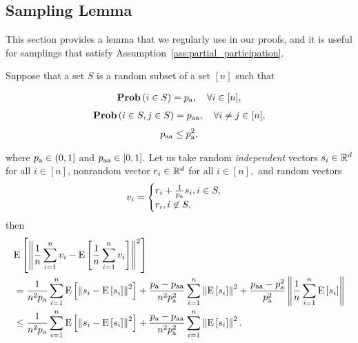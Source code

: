 \documentclass{article}
\newcommand*{\probavailable}{\ensuremath{p_{\textnormal{a}}}}
\newcommand*{\probpairaa}{\ensuremath{p_{\textnormal{aa}}}}
\begin{document}
\subsection{Sampling Lemma}
This section provides a lemma that we regularly use in our proofs, and it is useful for samplings that satisfy Assumption~\ref{ass:partial_participation}.
\begin{lemma}
  \label{lemma:sampling}
  Suppose that a set $S$ is a random subset of a set $[n]$ such that
  \begin{enumerate}
    \Item \begin{align*}\Prob\left(i \in S\right) = \probavailable, \quad \forall i \in [n],\end{align*}
    \Item \begin{align*}\Prob\left(i \in S, j \in S\right) = \probpairaa, \quad \forall i \neq j \in [n],\end{align*}
    \Item \begin{align*}
      \probpairaa \leq \probavailable^2,
    \end{align*}
  \end{enumerate}
  where $\probavailable \in (0, 1]$ and $\probpairaa \in [0, 1].$ Let us take random \textit{independent} vectors $s_i \in \mathbb{R}^d$ for all $i \in [n]$, nonrandom vector $r_i \in \mathbb{R}^d$ for all $i \in [n],$ and random vectors
  \begin{align*}
    v_i = \begin{cases}
      r_i + \frac{1}{\probavailable} s_i, i \in S, \\
      r_i, i \not\in S,
    \end{cases}
  \end{align*}
  then
  \begin{align*}
    &\Exp{\norm{\frac{1}{n}\sum_{i=1}^n v_i - \Exp{\frac{1}{n}\sum_{i=1}^n v_i}}^2} \\
    &= \frac{1}{n^2 \probavailable}\sum_{i=1}^n\Exp{\norm{s_i - \Exp{s_i}}^2} +\frac{\probavailable - \probpairaa}{n^2 \probavailable^2}\sum_{i=1}^n\norm{\Exp{s_i}}^2 + \frac{\probpairaa - \probavailable^2}{\probavailable^2}\norm{\frac{1}{n}\sum_{i=1}^n\Exp{s_i}}\\
    &\leq \frac{1}{n^2 \probavailable}\sum_{i=1}^n\Exp{\norm{s_i - \Exp{s_i}}^2} +\frac{\probavailable - \probpairaa}{n^2 \probavailable^2}\sum_{i=1}^n\norm{\Exp{s_i}}^2.
  \end{align*}
\end{lemma}
\end{document}
